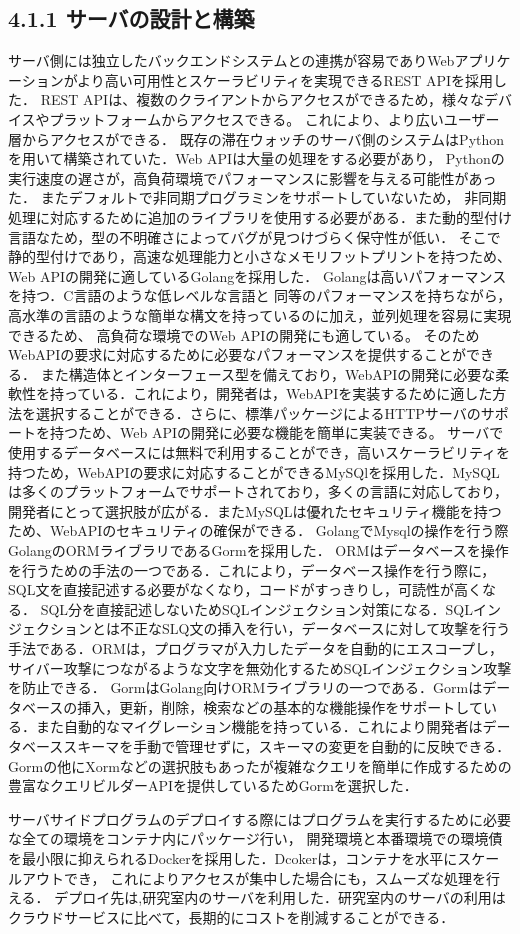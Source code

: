 



\subsection*{4.1.1 サーバの設計と構築}
サーバ側には独立したバックエンドシステムとの連携が容易でありWebアプリケーションがより高い可用性とスケーラビリティを実現できるREST APIを採用した．
REST APIは、複数のクライアントからアクセスができるため，様々なデバイスやプラットフォームからアクセスできる。
これにより、より広いユーザー層からアクセスができる．
既存の滞在ウォッチのサーバ側のシステムはPythonを用いて構築されていた．Web APIは大量の処理をする必要があり，
Pythonの実行速度の遅さが，高負荷環境でパフォーマンスに影響を与える可能性があった．
またデフォルトで非同期プログラミンをサポートしていないため，
非同期処理に対応するために追加のライブラリを使用する必要がある．また動的型付け言語なため，型の不明確さによってバグが見つけづらく保守性が低い．
そこで静的型付けであり，高速な処理能力と小さなメモリフットプリントを持つため、Web APIの開発に適しているGolangを採用した．
Golangは高いパフォーマンスを持つ．C言語のような低レベルな言語と
同等のパフォーマンスを持ちながら，高水準の言語のような簡単な構文を持っているのに加え，並列処理を容易に実現できるため、
高負荷な環境でのWeb APIの開発にも適している。
そのためWebAPIの要求に対応するために必要なパフォーマンスを提供することができる．
また構造体とインターフェース型を備えており，WebAPIの開発に必要な柔軟性を持っている．これにより，開発者は，WebAPIを実装するために適した方法を選択することができる．さらに、標準パッケージによるHTTPサーバのサポートを持つため、Web APIの開発に必要な機能を簡単に実装できる。
サーバで使用するデータベースには無料で利用することができ，高いスケーラビリティを持つため，WebAPIの要求に対応することができるMySQlを採用した．MySQLは多くのプラットフォームでサポートされており，多くの言語に対応しており，開発者にとって選択肢が広がる．またMySQLは優れたセキュリティ機能を持つため、WebAPIのセキュリティの確保ができる．
GolangでMysqlの操作を行う際GolangのORMライブラリであるGormを採用した．
ORMはデータベースを操作を行うための手法の一つである．これにより，データベース操作を行う際に，SQL文を直接記述する必要がなくなり，コードがすっきりし，可読性が高くなる．
SQL分を直接記述しないためSQLインジェクション対策になる．SQLインジェクションとは不正なSLQ文の挿入を行い，データベースに対して攻撃を行う手法である．ORMは，プログラマが入力したデータを自動的にエスコープし，サイバー攻撃につながるような文字を無効化するためSQLインジェクション攻撃を防止できる．
GormはGolang向けORMライブラリの一つである．Gormはデータベースの挿入，更新，削除，検索などの基本的な機能操作をサポートしている．また自動的なマイグレーション機能を持っている．これにより開発者はデータベーススキーマを手動で管理せずに，スキーマの変更を自動的に反映できる．
Gormの他にXormなどの選択肢もあったが複雑なクエリを簡単に作成するための豊富なクエリビルダーAPIを提供しているためGormを選択した．


サーバサイドプログラムのデプロイする際にはプログラムを実行するために必要な全ての環境をコンテナ内にパッケージ行い，
開発環境と本番環境での環境債を最小限に抑えられるDockerを採用した．Dcokerは，コンテナを水平にスケールアウトでき，
これによりアクセスが集中した場合にも，スムーズな処理を行える．
デプロイ先は,研究室内のサーバを利用した．研究室内のサーバの利用はクラウドサービスに比べて，長期的にコストを削減することができる．




